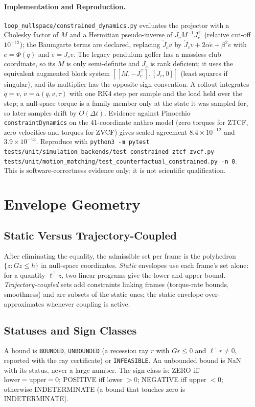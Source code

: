 \documentclass[11pt,a4paper]{article}
\begin{document}
\paragraph{Implementation and Reproduction.}
\texttt{loop\_nullspace/constrained\_dynamics.py} evaluates the projector with a
Cholesky factor of $M$ and a Hermitian pseudo-inverse of $J_cM^{-1}J_c^{\top}$
(relative cut-off $10^{-12}$); the Baumgarte terms are declared, replacing
$\dot J_cv$ by $\dot J_cv+2\alpha\dot e+\beta^2e$ with $e=\Phi(q)$ and
$\dot e=J_cv$.  The legacy pendulum golfer has a massless club coordinate, so
its $M$ is only semi-definite and $J_c$ is rank deficient; it uses the
equivalent augmented block system $[[M,-J_c^{\top}],[J_c,0]]$ (least squares if
singular), and its multiplier has the opposite sign convention.  A rollout
integrates $\dot q=v$, $\dot v=a(q,v,\tau)$ with one RK4 step per sample and the
load held over the step; a null-space torque is a family member only at the
state it was sampled for, so later samples drift by $O(\Delta t)$.  Evidence
against Pinocchio \texttt{constraintDynamics} on the 41-coordinate anthro model
(zero torques for ZTCF, zero velocities and torques for ZVCF) gives scaled
agreement $8.4\times10^{-12}$ and $3.9\times10^{-13}$.  Reproduce with
\texttt{python3 -m pytest tests/unit/simulation\_backends/test\_constrained\_ztcf\_zvcf.py
tests/unit/motion\_matching/test\_counterfactual\_constrained.py -n 0}.
This is software-correctness evidence only; it is not scientific qualification.

\section{Envelope Geometry}
\label{sec:envelope}

\subsection{Static Versus Trajectory-Coupled}
After eliminating the equality, the admissible set per frame is the polyhedron
$\{z: Gz\le h\}$ in null-space coordinates.  \emph{Static} envelopes use each
frame's set alone: for a quantity $\ell^{\top}z$, two linear programs give the
lower and upper bound.  \emph{Trajectory-coupled} sets add constraints linking
frames (torque-rate bounds, smoothness) and are subsets of the static ones;
the static envelope over-approximates whenever coupling is active.

\subsection{Statuses and Sign Classes}
A bound is \texttt{BOUNDED}, \texttt{UNBOUNDED} (a recession ray $r$ with
$Gr\le0$ and $\ell^{\top}r\neq0$, reported with the ray certificate) or
\texttt{INFEASIBLE}.  An unbounded bound is NaN with its status, never a large
number.  The sign class is: ZERO iff $\text{lower}=\text{upper}=0$; POSITIVE iff
lower $>0$; NEGATIVE iff upper $<0$; otherwise INDETERMINATE (a bound that
touches zero is INDETERMINATE).
\end{document}
